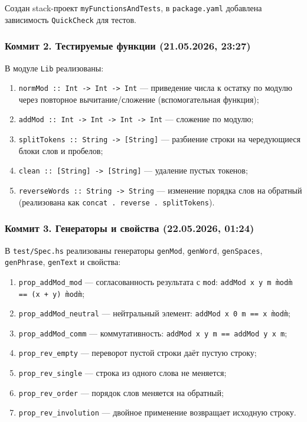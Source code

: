 \documentclass[a4paper, final]{article}
\begin{document}
Создан stack-проект \texttt{myFunctionsAndTests}, в \texttt{package.yaml}
добавлена зависимость \texttt{QuickCheck} для тестов.

\subsubsection{Коммит 2. Тестируемые функции (21.05.2026, 23:27)}

В модуле \texttt{Lib} реализованы:
\begin{enumerate}[label=\alph*),leftmargin=*]
  \item \texttt{normMod :: Int -> Int -> Int} — приведение числа к остатку по
        модулю через повторное вычитание/сложение (вспомогательная функция);
  \item \texttt{addMod :: Int -> Int -> Int -> Int} — сложение по модулю;
  \item \texttt{splitTokens :: String -> [String]} — разбиение строки на
        чередующиеся блоки слов и пробелов;
  \item \texttt{clean :: [String] -> [String]} — удаление пустых токенов;
  \item \texttt{reverseWords :: String -> String} — изменение порядка слов
        на обратный (реализована как \texttt{concat . reverse . splitTokens}).
\end{enumerate}

\subsubsection{Коммит 3. Генераторы и свойства (22.05.2026, 01:24)}

В \texttt{test/Spec.hs} реализованы генераторы \texttt{genMod},
\texttt{genWord}, \texttt{genSpaces}, \texttt{genPhrase}, \texttt{genText}
и свойства:
\begin{enumerate}[label=\alph*),leftmargin=*]
  \item \texttt{prop\_addMod\_mod} — согласованность результата с
        \texttt{mod}: \texttt{addMod x y m \`mod\` m == (x + y) \`mod\` m};
  \item \texttt{prop\_addMod\_neutral} — нейтральный элемент:
        \texttt{addMod x 0 m == x \`mod\` m};
  \item \texttt{prop\_addMod\_comm} — коммутативность:
        \texttt{addMod x y m == addMod y x m};
  \item \texttt{prop\_rev\_empty} — переворот пустой строки даёт пустую
        строку;
  \item \texttt{prop\_rev\_single} — строка из одного слова не меняется;
  \item \texttt{prop\_rev\_order} — порядок слов меняется на обратный;
  \item \texttt{prop\_rev\_involution} — двойное применение возвращает
        исходную строку.
\end{enumerate}
\end{document}
